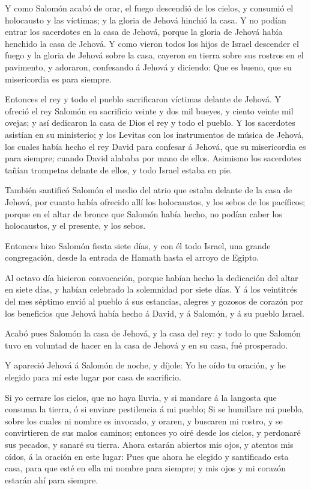  Y como Salomón acabó de orar, el fuego descendió de los
cielos, y consumió el holocausto y las víctimas; y la gloria de Jehová
hinchió la casa.  Y no podían entrar los sacerdotes en la
casa de Jehová, porque la gloria de Jehová había henchido la casa de
Jehová.  Y como vieron todos los hijos de Israel descender
el fuego y la gloria de Jehová sobre la casa, cayeron en tierra sobre
sus rostros en el pavimento, y adoraron, confesando á Jehová y diciendo:
Que es bueno, que su misericordia es para siempre.

 Entonces el rey y todo el pueblo sacrificaron víctimas
delante de Jehová.  Y ofreció el rey Salomón en sacrificio
veinte y dos mil bueyes, y ciento veinte mil ovejas; y así dedicaron la
casa de Dios el rey y todo el pueblo.  Y los sacerdotes
asistían en su ministerio; y los Levitas con los instrumentos de música
de Jehová, los cuales había hecho el rey David para confesar á Jehová,
que su misericordia es para siempre; cuando David alababa por mano de
ellos. Asimismo los sacerdotes tañían trompetas delante de ellos, y todo
Israel estaba en pie.

 También santificó Salomón el medio del atrio que estaba
delante de la casa de Jehová, por cuanto había ofrecido allí los
holocaustos, y los sebos de los pacíficos; porque en el altar de bronce
que Salomón había hecho, no podían caber los holocaustos, y el presente,
y los sebos.

 Entonces hizo Salomón fiesta siete días, y con él todo
Israel, una grande congregación, desde la entrada de Hamath hasta el
arroyo de Egipto.

 Al octavo día hicieron convocación, porque habían hecho la
dedicación del altar en siete días, y habían celebrado la solemnidad por
siete días.  Y á los veintitrés del mes séptimo envió al
pueblo á sus estancias, alegres y gozosos de corazón por los beneficios
que Jehová había hecho á David, y á Salomón, y á su pueblo Israel.

 Acabó pues Salomón la casa de Jehová, y la casa del rey: y
todo lo que Salomón tuvo en voluntad de hacer en la casa de Jehová y en
su casa, fué prosperado.

 Y apareció Jehová á Salomón de noche, y díjole: Yo he oído
tu oración, y he elegido para mí este lugar por casa de sacrificio.

 Si yo cerrare los cielos, que no haya lluvia, y si mandare
á la langosta que consuma la tierra, ó si enviare pestilencia á mi
pueblo;  Si se humillare mi pueblo, sobre los cuales ni
nombre es invocado, y oraren, y buscaren mi rostro, y se convirtieren de
sus malos caminos; entonces yo oiré desde los cielos, y perdonaré sus
pecados, y sanaré su tierra.  Ahora estarán abiertos mis
ojos, y atentos mis oídos, á la oración en este lugar: 
Pues que ahora he elegido y santificado esta casa, para que esté en ella
mi nombre para siempre; y mis ojos y mi corazón estarán ahí para
siempre.


